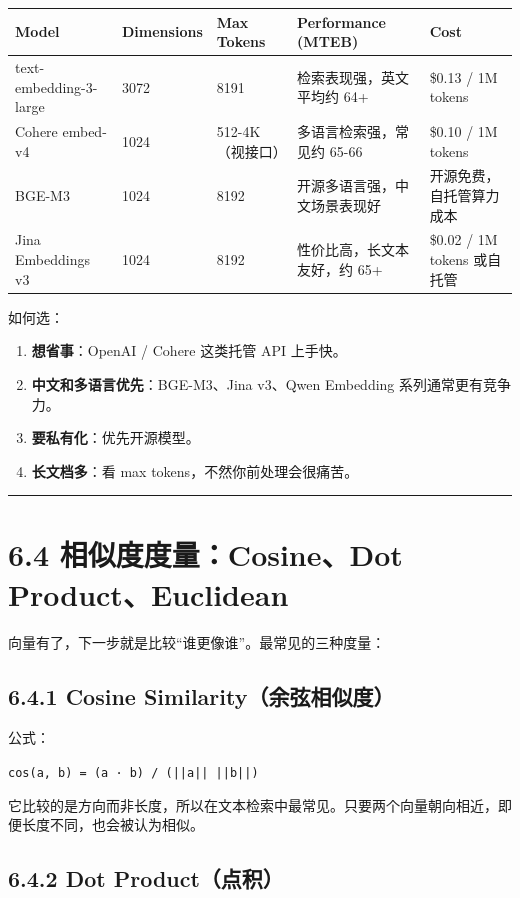 \begingroup
\scriptsize
\setlength{\tabcolsep}{3pt}
\begin{longtable}{|p{}|p{}|p{}|p{}|p{}|}
\hline
Model & Dimensions & Max Tokens & Performance (MTEB) & Cost \\ \hline
text-embedding-3-large & 3072 & 8191 & 检索表现强，英文平均约 64+ & \$0.13 / 1M tokens \\ \hline
Cohere embed-v4 & 1024 & 512-4K（视接口） & 多语言检索强，常见约 65-66 & \$0.10 / 1M tokens \\ \hline
BGE-M3 & 1024 & 8192 & 开源多语言强，中文场景表现好 & 开源免费，自托管算力成本 \\ \hline
Jina Embeddings v3 & 1024 & 8192 & 性价比高，长文本友好，约 65+ & \$0.02 / 1M tokens 或自托管 \\ \hline
\end{longtable}
\endgroup

如何选：


\begin{enumerate}[leftmargin=2em]
\item \textbf{想省事}：OpenAI / Cohere 这类托管 API 上手快。
\item \textbf{中文和多语言优先}：BGE-M3、Jina v3、Qwen Embedding 系列通常更有竞争力。
\item \textbf{要私有化}：优先开源模型。
\item \textbf{长文档多}：看 max tokens，不然你前处理会很痛苦。
\end{enumerate}

\bigskip\hrule\bigskip

\section{6.4 相似度度量：Cosine、Dot Product、Euclidean}

向量有了，下一步就是比较``谁更像谁''。最常见的三种度量：


\subsection{6.4.1 Cosine Similarity（余弦相似度）}

公式：


\texttt{cos(a, b) = (a · b) / (||a|| ||b||)}


它比较的是方向而非长度，所以在文本检索中最常见。只要两个向量朝向相近，即便长度不同，也会被认为相似。


\subsection{6.4.2 Dot Product（点积）}

